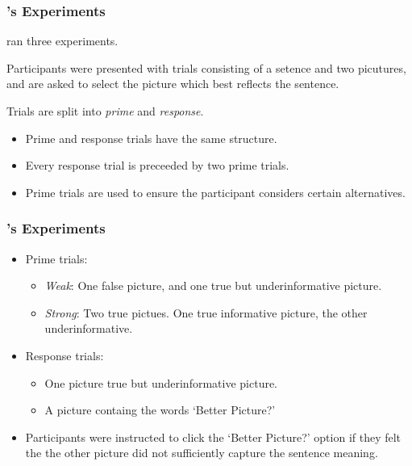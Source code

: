 \documentclass[noamssymb]{beamer}
\newcommand{\hand}{\ding{43}}
\begin{document}
\begin{frame}
  \frametitle{{\ftf \citeauthor{Bott:2016aa}'s Experiments}}

  \citeauthor{Bott:2016aa} ran three experiments.

  Participants were presented with trials consisting of a setence and two picutures, and are asked to select the picture which best reflects the sentence.

  Trials are split into \emph{prime} and \emph{response}.
  \begin{itemize}
  \item Prime and response trials have the same structure.
  \item Every response trial is preceeded by two prime trials.
  \item Prime trials are used to ensure the participant considers certain alternatives.
  \end{itemize}


\end{frame}

\begin{frame}
  \frametitle{{\ftf \citeauthor{Bott:2016aa}'s Experiments}}
  \begin{itemize}
  \item Prime trials:
    \begin{itemize}
    \item \emph{Weak}: One false picture, and one true but underinformative picture.
    \item \emph{Strong}: Two true pictues. One true informative picture, the other underinformative.
    \end{itemize}
  \item Response trials:
    \begin{itemize}
    \item One picture true but underinformative picture.
    \item A picture containg the words `Better Picture?'
    \end{itemize}
  \item[\hand] Participants were instructed to click the `Better Picture?' option  if they felt the the other picture did not sufficiently capture the sentence meaning.
  \end{itemize}
\end{frame}
\end{document}
